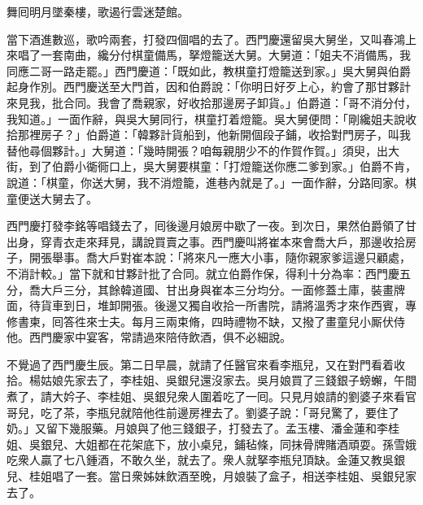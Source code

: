 舞囘明月墜秦樓，歌遏行雲迷楚館。

當下酒進數巡，歌吟兩套，打發四個唱的去了。西門慶還留吳大舅坐，又叫春鴻上來唱了一套南曲，纔分付棋童備馬，拏燈籠送大舅。大舅道：「姐夫不消備馬，我同應二哥一路走罷。」西門慶道：「既如此，教棋童打燈籠送到家。」吳大舅與伯爵起身作別。西門慶送至大門首，因和伯爵說：「你明日好歹上心，約會了那甘夥計來見我，批合同。我會了喬親家，好收拾那邊房子卸貨。」伯爵道：「哥不消分付，我知道。」一面作辭，與吳大舅同行，棋童打着燈籠。吳大舅便問：「剛纔姐夫說收拾那裡房子？」伯爵道：「韓夥計貨船到，他新開個段子鋪，收拾對門房子，叫我替他尋個夥計。」大舅道：「幾時開張？咱每親朋少不的作賀作賀。」{}須臾，出大街，到了伯爵小衚衕口上，吳大舅要棋童：「打燈籠送你應二爹到家。」伯爵不肯，說道：「棋童，你送大舅，我不消燈籠，進巷內就是了。」一面作辭，分路囘家。棋童便送大舅去了。

西門慶打發李銘等唱錢去了，囘後邊月娘房中歇了一夜。到次日，果然伯爵領了甘出身，穿青衣走來拜見，講說買賣之事。西門慶叫將崔本來會喬大戶，那邊收拾房子，開張舉事。喬大戶對崔本說：「將來凡一應大小事，隨你親家爹這邊只顧處，不消計較。」當下就和甘夥計批了合同。就立伯爵作保，得利十分為率：西門慶五分，喬大戶三分，其餘韓道國、甘出身與崔本三分均分。一面修蓋土庫，裝畫牌面，待貨車到日，堆卸開張。後邊又獨自收拾一所書院，請將溫秀才來作西賓，專修書柬，囘答徃來士夫。每月三兩束脩，四時禮物不缺，又撥了畫童兒小厮伏侍他。{}西門慶家中宴客，常請過來陪侍飲酒，俱不必細說。

不覺過了西門慶生辰。第二日早晨，就請了任醫官來看李瓶兒，又在對門看着收拾。楊姑娘先家去了，李桂姐、吳銀兒還沒家去。吳月娘買了三錢銀子螃蠏，午間煮了，請大妗子、李桂姐、吳銀兒衆人圍着吃了一囘。只見月娘請的劉婆子來看官哥兒，吃了茶，李瓶兒就陪他徃前邊房裡去了。劉婆子說：「哥兒驚了，要住了奶。」又留下幾服藥。月娘與了他三錢銀子，打發去了。孟玉樓、潘金蓮和李桂姐、吳銀兒、大姐都在花架底下，放小桌兒，鋪毡條，同抹骨牌賭酒頑耍。孫雪娥吃衆人贏了七八鍾酒，不敢久坐，就去了。衆人就拏李瓶兒頂缺。金蓮又教吳銀兒、桂姐唱了一套。當日衆姊妹飲酒至晚，月娘裝了盒子，相送李桂姐、吳銀兒家去了。

